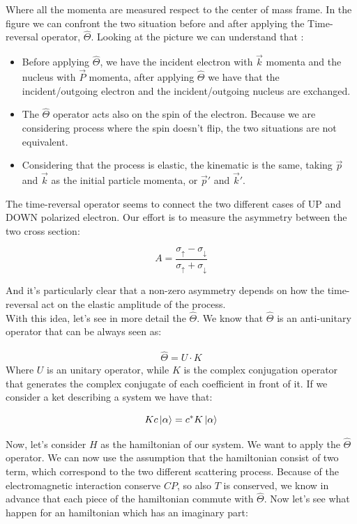 Where all the momenta are measured respect to the center of mass frame. In the figure we can confront the two situation before and after applying the Time-reversal operator, $\hat{\Theta}$. Looking at the picture we can understand that : 

\begin{itemize}
\item Before applying $\hat{\Theta}$, we have the incident electron with $\vec{k}$ momenta and the nucleus with $\vec{P}$ momenta, after applying $\hat{\Theta}$ we have that the incident/outgoing electron and the incident/outgoing nucleus are exchanged.
\item The $\hat{\Theta}$ operator acts also on the spin of the electron. Because we are considering process where the spin doesn't flip, the two situations are not equivalent.
\item Considering that the process is elastic, the kinematic is the same, taking $\vec{p}$ and $\vec{k}$ as the initial particle momenta, or $\vec{p}'$ and $\vec{k}'$. 

\end{itemize}

The time-reversal operator seems to connect the two different cases of UP and DOWN polarized electron. Our effort is to measure the asymmetry between the two cross section:

\begin{equation}
A = \frac{\sigma_{\uparrow} - \sigma_{\downarrow}}{\sigma_{\uparrow} + \sigma_{\downarrow}}
\end{equation}

And it's particularly clear that a non-zero asymmetry depends on how the time-reversal act on the elastic amplitude of the process. \\
With this idea, let's see in more detail the $\hat{\Theta}$. We know that $\hat{\Theta}$ is an anti-unitary operator that can be always seen as:

\begin{align*}
\hat{\Theta} = U \cdot K
\end{align*} 
Where $U$ is an unitary operator, while $K$ is the complex conjugation operator that generates the complex conjugate of each coefficient in front of it. If we consider a ket describing a system we have that:

\begin{equation}
Kc \ket{\alpha} = c^{*} K \ket{\alpha}
\end{equation}

Now, let's consider $H$ as the hamiltonian of our system. We want to apply the $\hat{\Theta}$ operator. We can now use the assumption that the hamiltonian consist of two term, which correspond to the two different scattering process. Because of the electromagnetic interaction conserve $CP$, so also $T$ is conserved, we know in advance that each piece of the hamiltonian commute with $\hat{\Theta}$. Now let's see what happen for an hamiltonian which has an imaginary part:


